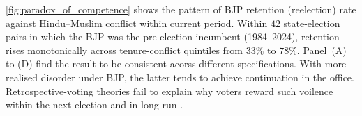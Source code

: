 \documentclass[11pt,twoside]{extarticle}
\begin{document}


\autoref{fig:paradox_of_competence} shows the pattern of BJP retention (reelection) rate against Hindu--Muslim conflict within current period. Within $42$ state-election pairs in which the BJP was the pre-election incumbent (1984--2024), retention rises monotonically across tenure-conflict quintiles from $33\%$ to $78\%$. Panel~(A) to (D) find the result to be consistent acorss different specifications. With more realised disorder under BJP, the latter tends to achieve continuation in the office. Retrospective-voting theories fail to explain why voters reward such voilence within the next election and in long run \citep*{wilkinsonVotesViolenceElectoral2006}.
\end{document}
